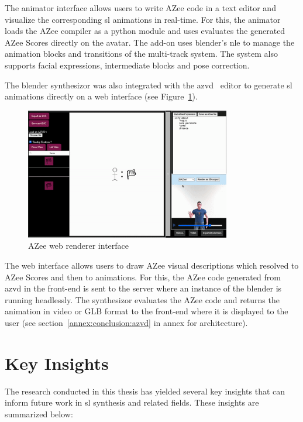 \documentclass[../../main.tex]{subfiles}
\begin{document}
The animator interface allows users to write AZee code in a text editor and visualize the corresponding \gls{sl} animations in real-time. For this, the animator loads the AZee compiler as a python module and uses evaluates the generated AZee Scores directly on the avatar. The add-on uses blender's \gls{nle} to manage the animation blocks and transitions of the multi-track system. The system also supports facial expressions, intermediate blocks and pose correction.

The blender synthesizor was also integrated with the \gls{azvd}~\cite{filhol2024software} editor to generate \gls{sl} animations directly on a web interface (see Figure~\ref{fig:conclusion:azee_web_interface}).

\begin{figure}[ht]
    \centering
    \includegraphics[width=0.8\textwidth]{chapters/conclusion/images/azee_web_interface.png}
    \caption{AZee web renderer interface}
    \label{fig:conclusion:azee_web_interface}
\end{figure}

The web interface allows users to draw AZee visual descriptions which resolved to AZee Scores and then to animations. For this, the AZee code generated from \gls{azvd} in the front-end is sent to the server where an instance of the blender is running headlessly. The synthesizor evaluates the AZee code and returns the animation in video or GLB format to the front-end where it is displayed to the user (see section~\ref{annex:conclusion:azvd} in annex for architecture).

\section{Key Insights}
\label{ch:conclusion:key_insights}

The research conducted in this thesis has yielded several key insights that can inform future work in \gls{sl} synthesis and related fields. These insights are summarized below:
\end{document}
